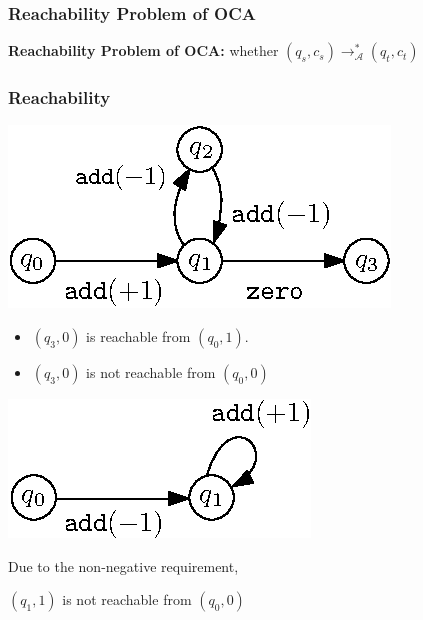 \documentclass[11pt]{beamer}
\begin{document}
\begin{frame}\frametitle{Reachability Problem of OCA}

\textbf{Reachability Problem of OCA: } whether $(q_s, c_s)\rightarrow^*_{\mathcal{A}} (q_t, c_t)$
\pause
\begin{example}\frametitle{Reachability}
\begin{multicols}{2}
\begin{center}
\includegraphics[scale=1]{reachexample.eps}
\end{center}
\begin{itemize}
\item  $(q_3, 0)$ is reachable from $(q_0, 1)$.
\item  $(q_3, 0)$ is not reachable from $(q_0, 0)$ 
\end{itemize}
\pause
\begin{center}
\includegraphics[scale=1]{reachexample2.eps}

\end{center}
Due to the non-negative requirement,

$(q_1, 1)$ is not reachable from $(q_0, 0)$



\end{multicols}

\end{example}
\end{frame}
\end{document}
